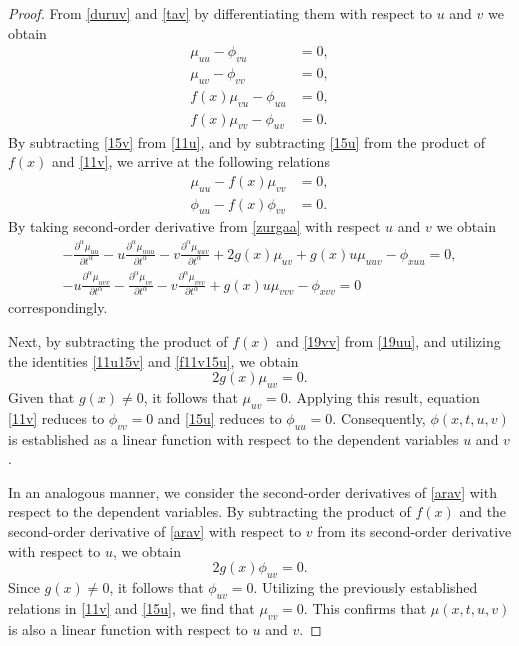 \documentclass[10pt,a4paper]{amsart}
\begin{document}
\begin{proof}
From \eqref{duruv} and \eqref{tav} by differentiating them with respect to $u$ and $v$ we obtain
\begin{align}
\mu_{uu} - \phi_{vu} &= 0, \label{11u} \\
\mu_{uv} - \phi_{vv} &= 0, \label{11v} \\
f(x)\mu_{vu} - \phi_{uu} &= 0,\label{15u}\\
f(x)\mu_{vv} - \phi_{uv} &= 0 \label{15v}.
\end{align}
By subtracting \eqref{15v} from \eqref{11u}, and by subtracting \eqref{15u} from the product of $f(x)$ and \eqref{11v},  we arrive at the following relations
\begin{align}
\mu_{uu} -  f(x) \mu_{vv} &= 0, \label{11u15v} \\
\phi_{uu} - f(x)\phi_{vv} &= 0 \label{f11v15u}. 
\end{align}
By taking second-order derivative from \eqref{zurgaa} with respect $u$ and $v$ we obtain
\begin{align}
-\frac{\partial^\alpha\mu_{uu}}{\partial t^\alpha}-u\frac{\partial^\alpha\mu_{uuu}}{\partial t^\alpha}-v\frac{\partial^\alpha\mu_{uuv}}{\partial t^\alpha}+2g(x)\mu_{uv}+g(x)u\mu_{uuv}-\phi_{xuu}=0 \label{19uu}, \\
-u\frac{\partial^\alpha\mu_{uvv}}{\partial t^\alpha}-\frac{\partial^\alpha\mu_{vv}}{\partial t^\alpha}-v\frac{\partial^\alpha\mu_{vvv}}{\partial t^\alpha}+g(x)u\mu_{vvv}-\phi_{xvv}=0
\label{19vv} 
\end{align}
correspondingly. 

Next, by subtracting the product of $f(x)$ and \eqref{19vv} from \eqref{19uu}, and utilizing the identities \eqref{11u15v} and \eqref{f11v15u}, we obtain
\begin{equation}
2g(x)\mu_{uv} = 0.
\end{equation}
Given that $g(x) \neq 0$, it follows that $\mu_{uv} = 0$. Applying this result, equation \eqref{11v} reduces to $\phi_{vv} = 0$ and \eqref{15u} reduces to $\phi_{uu} = 0$. Consequently, $\phi(x, t, u, v)$ is established as a linear function with respect to the dependent variables $u$ and $v$.

In an analogous manner, we consider the second-order derivatives of \eqref{arav} with respect to the dependent variables. By subtracting the product of $f(x)$ and the second-order derivative of \eqref{arav} with respect to $v$ from its second-order derivative with respect to $u$, we obtain
\begin{equation}
2g(x)\phi_{uv} = 0.
\end{equation}
Since $g(x) \neq 0$, it follows that $\phi_{uv} = 0$. Utilizing the previously established relations in \eqref{11v} and \eqref{15u}, we find that $\mu_{vv} = 0$. This confirms that $\mu(x, t, u, v)$ is also a linear function with respect to $u$ and $v$. 


\end{proof}
\end{document}
